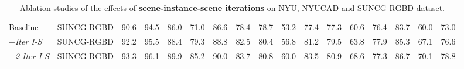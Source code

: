 \documentclass[final]{cvpr}
\begin{document}
\begin{table*}[t!]
\begin{center}
{\begin{tabular}{|l|c |c c c|c c c c c c c c c c c | c|}
Baseline& SUNCG-RGBD  &	
90.6&	94.5&	86.0&	71.0&	86.6&	78.4&	78.7&	53.2&	77.4&	77.3&	60.6&	76.4&	83.7&	60.0&	73.0\\
+\textit{Iter I-S} & SUNCG-RGBD  &
92.2&	95.5&	88.4&	79.3&	88.8&	82.5&	80.4&	56.8&	81.2&	79.5&	63.8&	77.9&	85.3&	67.1&	76.6\\
+\textit{2-Iter I-S }  & SUNCG-RGBD  &
93.3&	96.1&	89.9&	85.2&	90.0&	83.7&	80.8&	60.0&	83.5&	80.9&	68.6&	77.3&	86.7&	70.1&	78.8\\
\hline
\end{tabular}
}
\end{center}
\vspace{-0.2cm}
\caption{Ablation studies of the effects of \textbf{scene-instance-scene iterations} on NYU, NYUCAD and SUNCG-RGBD dataset.}
\label{tab:ablation-iteration}
\vspace{-0.3cm}
\end{table*} \begin{table}[t]
\begin{center}

\end{center}
\vspace{-0.2cm}
\caption{Efficiency with different methods on NYU dataset.}
\label{tab:ablation-cost}
\vspace{-0.3cm}
\end{table}
%
\end{document}
